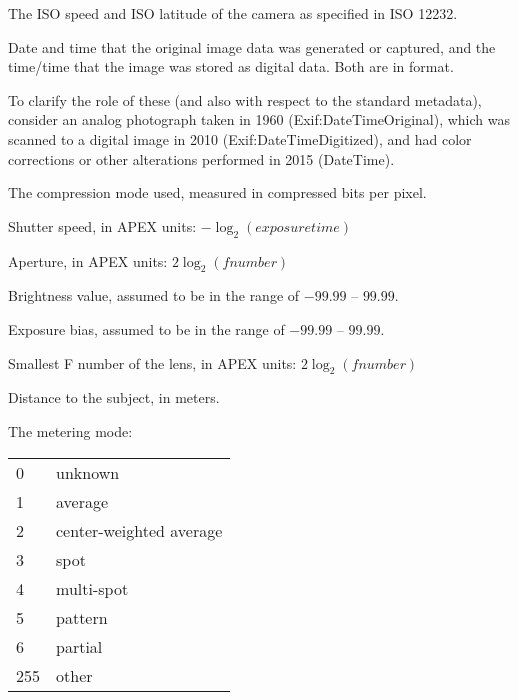 The ISO speed and ISO latitude of the camera as specified in ISO 12232.
\apiend


Date and time that the original image data was generated or captured,
and the time/time that the image was stored as digital data. Both are in
 format.

To clarify the role of these (and also with respect to the standard
 metadata), consider an analog photograph taken in 1960
({\cf Exif:DateTimeOriginal}), which was scanned to a digital image in 2010
({\cf Exif:DateTimeDigitized}), and had color corrections or other
alterations performed in 2015 ({\cf DateTime}).
\apiend

The compression mode used, measured in compressed bits per pixel.
\apiend

Shutter speed, in APEX units: $-\log_2 (\mathit{exposure time})$
\apiend

Aperture, in APEX units: $2 \log_2 (\mathit{fnumber})$
\apiend

Brightness value, assumed to be in the range of $-99.99$ -- $99.99$.
\apiend

Exposure bias, assumed to be in the range of $-99.99$ -- $99.99$.
\apiend

Smallest F number of the lens, in APEX units: $2 \log_2 (\mathit{fnumber})$
\apiend

Distance to the subject, in meters.
\apiend

The metering mode:

\smallskip

\begin{tabular}{p{0.3in} p{4in}}
0 & unknown \\
1 & average \\
2 & center-weighted average \\
3 & spot \\
4 & multi-spot \\
5 & pattern \\
6 & partial \\
255 & other
\end{tabular}
\apiend

